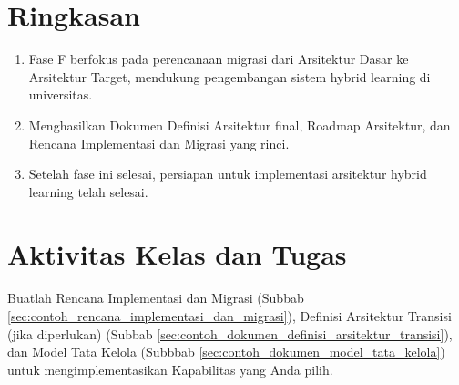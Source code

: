 \section{Ringkasan}
\begin{enumerate}
	\item Fase F berfokus pada perencanaan migrasi dari Arsitektur Dasar ke Arsitektur Target, mendukung pengembangan sistem hybrid learning di universitas.
	\item Menghasilkan Dokumen Definisi Arsitektur final, Roadmap Arsitektur, dan Rencana Implementasi dan Migrasi yang rinci.
	\item Setelah fase ini selesai, persiapan untuk implementasi arsitektur hybrid learning telah selesai.
\end{enumerate}




\section{Aktivitas Kelas dan Tugas}

Buatlah Rencana Implementasi dan Migrasi (Subbab \ref{sec:contoh_rencana_implementasi_dan_migrasi}), Definisi Arsitektur Transisi (jika diperlukan) (Subbab \ref{sec:contoh_dokumen_definisi_arsitektur_transisi}), dan Model Tata Kelola (Subbbab \ref{sec:contoh_dokumen_model_tata_kelola}) untuk mengimplementasikan Kapabilitas yang Anda pilih.